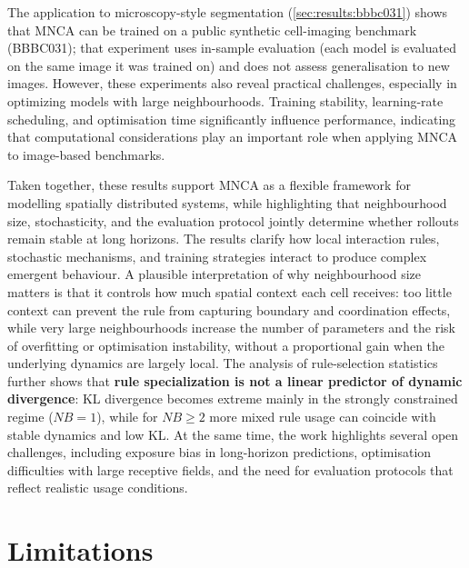 The application to microscopy-style segmentation (\cref{sec:results:bbbc031}) shows that MNCA can be trained on a public synthetic cell-imaging benchmark (BBBC031); that experiment uses in-sample evaluation (each model is evaluated on the same image it was trained on) and does not assess generalisation to new images.
However, these experiments also reveal practical challenges, especially in optimizing models with large neighbourhoods.
Training stability, learning-rate scheduling, and optimisation time significantly influence performance, indicating that computational considerations play an important role when applying MNCA to image-based benchmarks.

Taken together, these results support MNCA as a flexible framework for modelling spatially distributed systems, while highlighting that neighbourhood size, stochasticity, and the evaluation protocol jointly determine whether rollouts remain stable at long horizons.
The results clarify how local interaction rules, stochastic mechanisms, and training strategies interact to produce complex emergent behaviour.
A plausible interpretation of why neighbourhood size matters is that it controls how much spatial context each cell receives: too little context can prevent the rule from capturing boundary and coordination effects, while very large neighbourhoods increase the number of parameters and the risk of overfitting or optimisation instability, without a proportional gain when the underlying dynamics are largely local.
The analysis of rule-selection statistics further shows that \textbf{rule specialization is not a linear predictor of dynamic divergence}: KL divergence becomes extreme mainly in the strongly constrained regime (\(NB=1\)), while for \(NB\ge2\) more mixed rule usage can coincide with stable dynamics and low KL.
At the same time, the work highlights several open challenges, including exposure bias in long-horizon predictions, optimisation difficulties with large receptive fields, and the need for evaluation protocols that reflect realistic usage conditions.

\section{Limitations}
\label{sec:conc:limitations}

